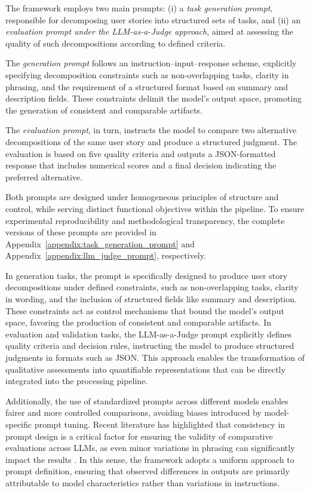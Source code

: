 \documentclass[pdflatex,sn-mathphys-num]{sn-jnl}
\theoremstyle{thmstyleone}%
\theoremstyle{thmstyletwo}%
\theoremstyle{thmstylethree}%
\begin{document}
The framework employs two main prompts: (i) a \textit{task generation prompt}, responsible for decomposing user stories into structured sets of tasks, and (ii) an \textit{evaluation prompt under the LLM-as-a-Judge approach}, aimed at assessing the quality of such decompositions according to defined criteria.

The \textit{generation prompt} follows an instruction–input–response scheme, explicitly specifying decomposition constraints such as non-overlapping tasks, clarity in phrasing, and the requirement of a structured format based on summary and description fields. These constraints delimit the model’s output space, promoting the generation of consistent and comparable artifacts.

The \textit{evaluation prompt}, in turn, instructs the model to compare two alternative decompositions of the same user story and produce a structured judgment. The evaluation is based on five quality criteria and outputs a JSON-formatted response that includes numerical scores and a final decision indicating the preferred alternative.

Both prompts are designed under homogeneous principles of structure and control, while serving distinct functional objectives within the pipeline. To ensure experimental reproducibility and methodological transparency, the complete versions of these prompts are provided in Appendix~\ref{appendix:task_generation_prompt} and Appendix~\ref{appendix:llm_judge_prompt}, respectively.

In generation tasks, the prompt is specifically designed to produce user story decompositions under defined constraints, such as non-overlapping tasks, clarity in wording, and the inclusion of structured fields like summary and description. These constraints act as control mechanisms that bound the model’s output space, favoring the production of consistent and comparable artifacts. In evaluation and validation tasks, the LLM-as-a-Judge prompt explicitly defines quality criteria and decision rules, instructing the model to produce structured judgments in formats such as JSON. This approach enables the transformation of qualitative assessments into quantifiable representations that can be directly integrated into the processing pipeline.

Additionally, the use of standardized prompts across different models enables fairer and more controlled comparisons, avoiding biases introduced by model-specific prompt tuning. Recent literature has highlighted that consistency in prompt design is a critical factor for ensuring the validity of comparative evaluations across LLMs, as even minor variations in phrasing can significantly impact the results \cite{structured_prompting}. In this sense, the framework adopts a uniform approach to prompt definition, ensuring that observed differences in outputs are primarily attributable to model characteristics rather than variations in instructions.
\end{document}
